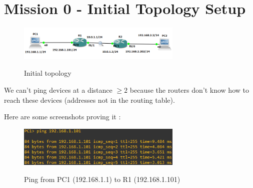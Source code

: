 \documentclass[10pt,a4paper]{ULBreport}
\begin{document}
 



\chapter{Mission 0 - Initial Topology Setup}

\begin{figure}[H]
    \caption{Initial topology}
    \centering
    \includegraphics[width=0.7\textwidth]{topology.png}
    \label{topo}
\end{figure}





We can't ping devices at a distance $\geq 2$ because the routers don't know how to reach these devices (addresses not in the routing table).

Here are some screenshots proving it :

\begin{figure}[H]
    \caption{Ping from PC1 (192.168.1.1) to R1 (192.168.1.101)}
    \centering
    \includegraphics[width=0.7\textwidth]{pingPC1R1.png}
    \label{pingPC1R1}
\end{figure}
\end{document}
